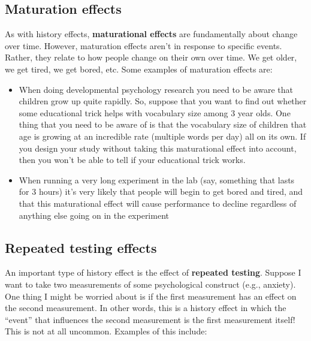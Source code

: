 \documentclass[
  a4paper,
]{book}
\providecommand{\tightlist}{%
  \setlength{\itemsep}{0pt}\setlength{\parskip}{0pt}}\usepackage{longtable,booktabs,array}
\begin{document}
\hypertarget{maturation-effects}{%
\subsection{Maturation effects}\label{maturation-effects}}

As with history effects, \textbf{maturational effects} are fundamentally
about change over time. However, maturation effects aren't in response
to specific events. Rather, they relate to how people change on their
own over time. We get older, we get tired, we get bored, etc. Some
examples of maturation effects are:

\begin{itemize}
\tightlist
\item
  When doing developmental psychology research you need to be aware that
  children grow up quite rapidly. So, suppose that you want to find out
  whether some educational trick helps with vocabulary size among 3 year
  olds. One thing that you need to be aware of is that the vocabulary
  size of children that age is growing at an incredible rate (multiple
  words per day) all on its own. If you design your study without taking
  this maturational effect into account, then you won't be able to tell
  if your educational trick works.
\item
  When running a very long experiment in the lab (say, something that
  lasts for 3 hours) it's very likely that people will begin to get
  bored and tired, and that this maturational effect will cause
  performance to decline regardless of anything else going on in the
  experiment
\end{itemize}

\hypertarget{repeated-testing-effects}{%
\subsection{Repeated testing effects}\label{repeated-testing-effects}}

An important type of history effect is the effect of \textbf{repeated
testing}. Suppose I want to take two measurements of some psychological
construct (e.g., anxiety). One thing I might be worried about is if the
first measurement has an effect on the second measurement. In other
words, this is a history effect in which the ``event'' that influences
the second measurement is the first measurement itself! This is not at
all uncommon. Examples of this include:
\end{document}
